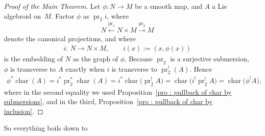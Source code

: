 \documentclass[11pt]{article}
\numberwithin{equation}{section}
\newcommand{\rmap}{\longrightarrow}
\newcommand{\lmap}{\longleftarrow}
\newcommand{\pr}{\operatorname{pr}}
\newcommand{\8}{\infty}
\begin{document}
\begin{proof}[Proof of the Main Theorem] Let $\phi \colon N \to M$ be a smooth map, and $A$ a Lie algebroid on~$M$. Factor $\phi$ as $\pr_2i$, where
\begin{gather*}
N \stackrel{\pr_1}{\lmap} N \times M \stackrel{\pr_2}{\rmap} M
\end{gather*}denote the canonical projections, and where
\begin{gather*}
 i\colon \ N \rmap N \times M, \qquad i(x):=(x,\phi(x))
\end{gather*}is the embedding of $N$ as the graph of $\phi$. Because $\pr_2$ is a surjective submersion, $\phi$ is transverse to $A$ exactly when $i$ is transverse to $\pr_2^!(A)$. Hence
\begin{align*}
 \phi^*\operatorname{char}(A) = i^*\pr_2^*\operatorname{char}(A) = i^*\operatorname{char}\big(\pr_2^!A\big) = \operatorname{char}\big(i^!\pr_2^!A\big) = \operatorname{char}\big(\phi^!A\big),
\end{align*}where in the second equality we used Proposition~\ref{pro : pullback of char by submersions}, and in the third, Proposition~\ref{pro : pullback of char by inclusion}.
\end{proof}

So everything boils down to
\end{document}
